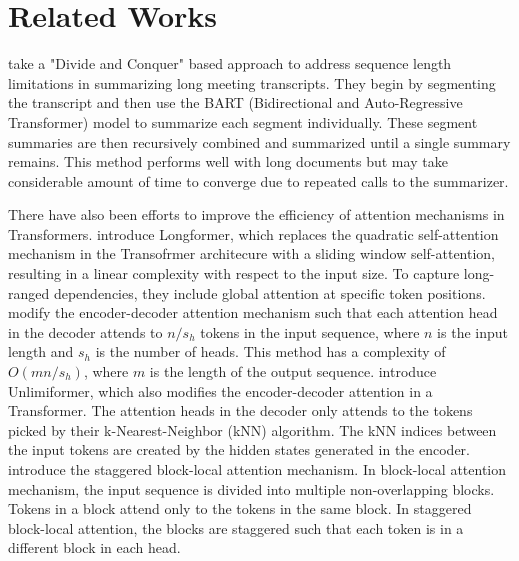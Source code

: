\section{Related Works}
\label{sec:related-works}

\citet{golia2024action} take a "Divide and Conquer" based approach to address
sequence length limitations in summarizing long meeting transcripts.
They begin by segmenting the transcript and then use the BART (Bidirectional and
Auto-Regressive Transformer) model to summarize each segment individually.
These segment summaries are then recursively combined and summarized until a single
summary remains.
This method performs well with long documents but may take considerable amount of time
to converge due to repeated calls to the summarizer.

There have also been efforts to improve the efficiency of attention mechanisms in Transformers.
\citet{beltagy2020longformer} introduce Longformer, which replaces the quadratic
self-attention mechanism in the Transofrmer architecure with a sliding window self-attention,
resulting in a linear complexity with respect to the input size.
To capture long-ranged dependencies, they include global attention at specific token positions.
\citet{huang-etal-2021-efficient} modify the encoder-decoder attention mechanism such that
each attention head in the decoder attends to $n/s_h$ tokens in the input sequence, where
$n$ is the input length and $s_h$ is the number of heads.
This method has a complexity of $O(mn/s_h)$, where $m$ is the length of the output sequence.
\citet{bertsch2023unlimiformer} introduce Unlimiformer, which also modifies the encoder-decoder
attention in a Transformer.
The attention heads in the decoder only attends to the tokens picked by their
k-Nearest-Neighbor (kNN) algorithm.
The kNN indices between the input tokens are created by the hidden states generated in the
encoder.
\citet{phang2022investigating} introduce the staggered block-local attention mechanism.
In block-local attention mechanism, the input sequence is divided into multiple
non-overlapping blocks.
Tokens in a block attend only to the tokens in the same block.
In staggered block-local attention, the blocks are staggered such that each token is in a
different block in each head.

